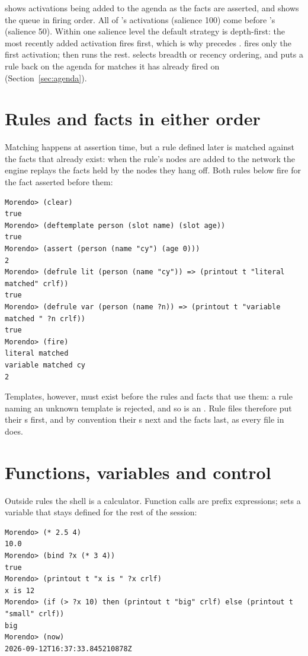  shows activations being added to the agenda as
the facts are asserted, and  shows the queue in firing
order. All of 's activations (salience 100) come before
's (salience 50). Within one salience level the default strategy
is depth-first: the most recently added activation fires first, which is
why  precedes .  fires only the first
activation;  then runs the rest.  selects
breadth or recency ordering, and  puts a rule back on
the agenda for matches it has already fired on (Section~\ref{sec:agenda}).

\section{Rules and facts in either order}
\label{sec:rules-before-facts}

Matching happens at assertion time, but a rule defined later is matched
against the facts that already exist: when the rule's nodes are added to
the network the engine replays the facts held by the nodes they hang off.
Both rules below fire for the fact asserted before them:

\begin{lstlisting}[style=shell]
Morendo> (clear)
true
Morendo> (deftemplate person (slot name) (slot age))
true
Morendo> (assert (person (name "cy") (age 0)))
2
Morendo> (defrule lit (person (name "cy")) => (printout t "literal matched" crlf))
true
Morendo> (defrule var (person (name ?n)) => (printout t "variable matched " ?n crlf))
true
Morendo> (fire)
literal matched
variable matched cy
2
\end{lstlisting}

Templates, however, must exist before the rules and facts that use them:
a rule naming an unknown template is rejected, and so is an .
Rule files therefore put their s first, and by convention
their s next and the facts last, as every file in
 does.

\section{Functions, variables and control}

Outside rules the shell is a calculator. Function calls are prefix
expressions;  sets a variable that stays defined for the rest of
the session:

\begin{lstlisting}[style=shell]
Morendo> (* 2.5 4)
10.0
Morendo> (bind ?x (* 3 4))
true
Morendo> (printout t "x is " ?x crlf)
x is 12
Morendo> (if (> ?x 10) then (printout t "big" crlf) else (printout t "small" crlf))
big
Morendo> (now)
2026-09-12T16:37:33.845210878Z
\end{lstlisting}

